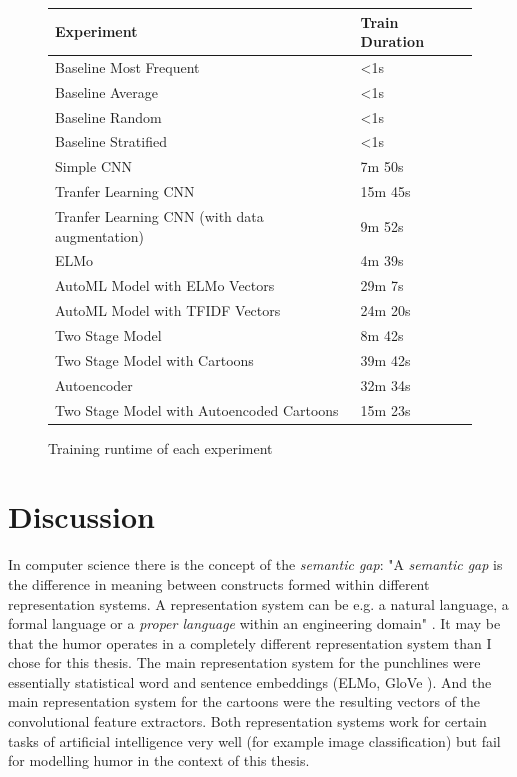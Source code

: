 \documentclass[draft,final,oneside]{vutinfth} %
\begin{document}
\begin{figure}
\centering
\begin{tabular}{|l|l|} 
\hline
\textbf{Experiment}                                    & \textbf{Train Duration}  \\ 
\hline
Baseline Most Frequent                        & \textless{}1s   \\
Baseline Average                              & \textless{}1s   \\
Baseline Random                               & \textless{}1s   \\
Baseline Stratified                           & \textless{}1s   \\
Simple CNN                                    & 7m 50s          \\
Tranfer Learning CNN                          & 15m 45s         \\
Tranfer Learning CNN (with data augmentation) & 9m 52s          \\
ELMo                                          & 4m 39s          \\
AutoML Model with ELMo Vectors                & 29m 7s          \\
AutoML Model with TFIDF Vectors               & 24m 20s         \\
Two Stage Model                               & 8m 42s          \\
Two Stage Model with Cartoons                 & 39m 42s         \\
Autoencoder                                   & 32m 34s         \\
Two Stage Model with Autoencoded Cartoons     & 15m 23s         \\
\hline
\end{tabular}
\caption{Training runtime of each experiment}
\label{trainingruntime}
\end{figure}

\pagebreak

\section{Discussion}

In computer science there is the concept of the \textit{semantic gap}: "A \textit{semantic gap} is the difference in meaning between constructs formed within different representation systems. A representation system can be e.g. a natural language, a formal language
or a \textit{proper language} within an engineering domain" \cite{semanticgap}. It may be that the humor operates in a completely different representation system than I chose for this thesis. The main representation system for the punchlines were essentially statistical word and sentence embeddings (ELMo, GloVe \cite{glovepage}\cite{elmo}). And the main representation system for the cartoons were the resulting vectors of the convolutional feature extractors. Both representation systems work for certain tasks of artificial intelligence very well (for example image classification) but fail for modelling humor in the context of this thesis.
\end{document}
